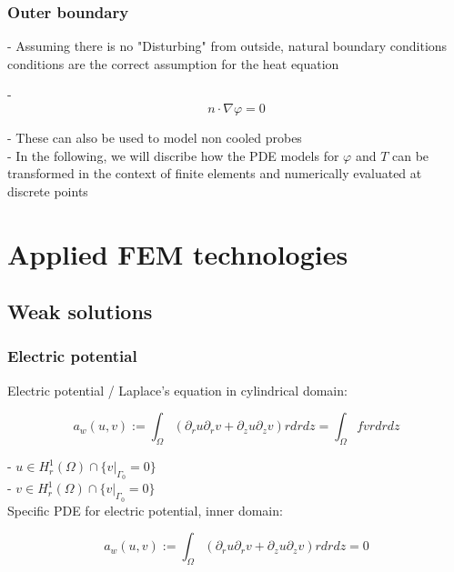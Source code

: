 \documentclass[parskip=half, titlepage=yes, 12pt, BCOR=12mm, DIV=calc]{scrartcl}
\begin{document}
\subsubsection{Outer boundary}

- Assuming there is no "Disturbing" from outside, natural boundary conditions conditions are the correct assumption for the heat equation  

- \begin{equation}
    n \cdot \nabla \varphi = 0
\end{equation}

- These can also be used to model non cooled probes \\

- In the following, we will discribe how the PDE models for $\varphi$ and $T$ can be transformed in the context of finite elements and numerically evaluated at discrete points \\


\section{Applied FEM technologies}

\subsection{Weak solutions}
\subsubsection{Electric potential}

Electric potential / Laplace's equation in cylindrical domain:

\begin{equation}
    a_w(u,v) := \int_{\Omega} (\partial_r u \partial_r v + \partial_z u \partial_z v) r drdz = \int_{\Omega} f v r dr dz
\end{equation}

- $u \in H_r^1(\Omega) \cap \{v|_{\Gamma_{0}} = 0 \} $ \\
- $v \in H_r^1(\Omega) \cap \{v|_{\Gamma_{0}} = 0 \} $ \\

Specific PDE for electric potential, inner domain: 

\begin{equation}
    a_w(u,v) := \int_{\Omega} (\partial_r u \partial_r v + \partial_z u \partial_z v) r drdz = 0 
\end{equation}
\end{document}
